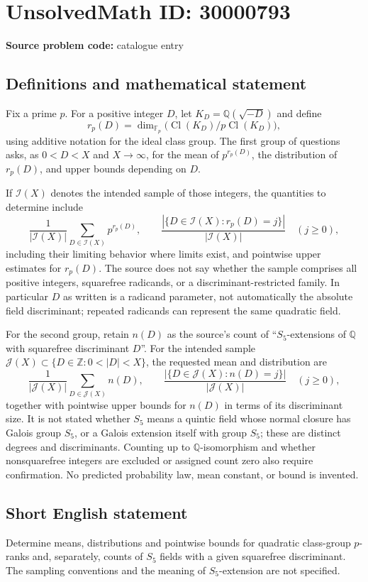 \documentclass[11pt]{article}
\newcommand{\Z}{\mathbb{Z}}
\newcommand{\Q}{\mathbb{Q}}
\newcommand{\F}{\mathbb{F}}
\begin{document}
\section*{UnsolvedMath ID: 30000793}
\textbf{Source problem code:} catalogue entry
\subsection{Definitions and mathematical statement}
Fix a prime $p$. For a positive integer $D$, let $K_D=\Q(\sqrt{-D})$ and define
\[
r_p(D)=\dim_{\F_p}\bigl(\operatorname{Cl}(K_D)/p\operatorname{Cl}(K_D)\bigr),
\]
using additive notation for the ideal class group. The first group of questions asks, as $0<D<X$ and $X\to\infty$, for the mean of $p^{r_p(D)}$, the distribution of $r_p(D)$, and upper bounds depending on $D$.

If $\mathcal I(X)$ denotes the intended sample of those integers, the quantities to determine include
\[
\frac{1}{|\mathcal I(X)|}\sum_{D\in\mathcal I(X)}p^{r_p(D)},
\qquad
\frac{|\{D\in\mathcal I(X):r_p(D)=j\}|}{|\mathcal I(X)|}
\quad(j\geq0),
\]
including their limiting behavior where limits exist, and pointwise upper estimates for $r_p(D)$. The source does not say whether the sample comprises all positive integers, squarefree radicands, or a discriminant-restricted family. In particular $D$ as written is a radicand parameter, not automatically the absolute field discriminant; repeated radicands can represent the same quadratic field.

For the second group, retain $n(D)$ as the source's count of ``$S_5$-extensions of $\Q$ with squarefree discriminant $D$''. For the intended sample $\mathcal J(X)\subset\{D\in\Z:0<|D|<X\}$, the requested mean and distribution are
\[
\frac{1}{|\mathcal J(X)|}\sum_{D\in\mathcal J(X)}n(D),
\qquad
\frac{|\{D\in\mathcal J(X):n(D)=j\}|}{|\mathcal J(X)|}
\quad(j\geq0),
\]
together with pointwise upper bounds for $n(D)$ in terms of its discriminant size. It is not stated whether $S_5$ means a quintic field whose normal closure has Galois group $S_5$, or a Galois extension itself with group $S_5$; these are distinct degrees and discriminants. Counting up to $\Q$-isomorphism and whether nonsquarefree integers are excluded or assigned count zero also require confirmation. No predicted probability law, mean constant, or bound is invented.
\subsection{Short English statement}
Determine means, distributions and pointwise bounds for quadratic class-group $p$-ranks and, separately, counts of $S_5$ fields with a given squarefree discriminant. The sampling conventions and the meaning of $S_5$-extension are not specified.
\end{document}
